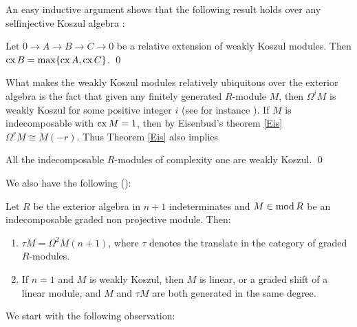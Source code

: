 \documentclass[10pt]{amsart}
\begin{document}
\medskip
\noindent An easy inductive argument 
shows that the following result holds over any selfinjective Koszul algebra :

\begin{prop}\label{complexity middle} Let $0\rightarrow A\rightarrow B\rightarrow C\rightarrow 0$ be a relative 
extension of weakly Koszul modules. Then $\operatorname{cx}\nolimits B=\max\{\operatorname{cx}\nolimits A,\operatorname{cx}\nolimits C\}$. \qed
\end{prop}

\noindent What makes the weakly Koszul modules relatively ubiquitous over the exterior algebra 
is the fact that given any finitely generated $R$-module $M$, then $\Omega^iM$ is weakly  
Koszul for some positive integer $i$ (see for instance \cite{HI,MVZ1}).  If $M$ is indecomposable with
$\operatorname{cx}\nolimits M =1$, then by Eisenbud's theorem \ref{Eis} $\Omega^rM \cong M(-r)$. Thus Theorem \ref{Eis} 
also implies

\begin{cor}\label{cx1}All the indecomposable $R$-modules of complexity one are weakly Koszul. \qed
\end{cor}
\smallskip

\noindent We also have the following (\cite{MVZ1}):

\begin{prop}\label{background} Let $R$ be the exterior algebra in $n+1$ indeterminates and $M\in\operatorname{mod} R$ be an 
indecomposable graded non projective module. Then: 
\begin{enumerate}
\item $\tau M=\Omega^2M(n+1)$, where $\tau$ denotes the \AR translate in the category of graded $R$-modules.
\item If $n=1$  and $M$ is weakly Koszul, then  $M$ is linear, or a graded shift of a linear module, 
and $M$ and $\tau M$ are both generated in the same degree.
\end{enumerate}
\end{prop}


\noindent We start with the following observation:
\end{document}
